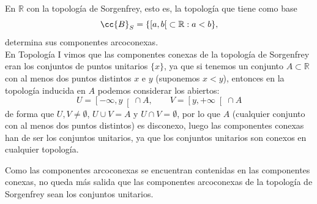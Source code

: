 \begin{ejercicio}
    En $\mathbb{R}$ con la topología de Sorgenfrey, esto es, la topología que tiene como base
    \begin{equation*}
        \cc{B}_S = \{\left[a,b\right[ \subset \mathbb{R} : a<b\},
    \end{equation*}
    determina sus componentes arcoconexas.\\

    \noindent
    En Topología I vimos que las componentes conexas de la topología de Sorgenfrey eran los conjuntos de puntos unitarios $\{x\}$, ya que si tenemos un conjunto $A\subset \mathbb{R}$ con al menos dos puntos distintos $x$ e $y$ (suponemos $x<y$), entonces en la topología inducida en $A$ podemos considerar los abiertos:
    \begin{equation*}
        U = \left[-\infty,y\right[\cap A, \qquad V = \left[y,+\infty\right[\cap A
    \end{equation*}
    de forma que $U,V\neq \emptyset $, $U\cup V = A$ y $U\cap V = \emptyset $, por lo que $A$ (cualquier conjunto con al menos dos puntos distintos) es disconexo, luego las componentes conexas han de ser los conjuntos unitarios, ya que los conjuntos unitarios son conexos en cualquier topología.

    Como las componentes arcoconexas se encuentran contenidas en las componentes conexas, no queda más salida que las componentes arcoconexas de la topología de Sorgenfrey sean los conjuntos unitarios.
\end{ejercicio}

